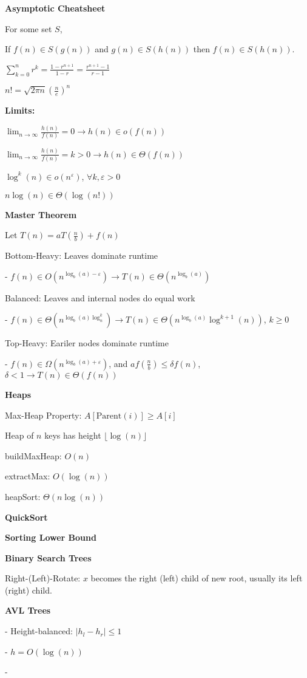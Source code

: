 \documentclass[8pt, letterpaper]{extarticle}
\begin{document}
\vline
\hspace{1pt}
\begin{minipage}[t]{0.45\textwidth}

\textbf{Asymptotic Cheatsheet}

For some set $S$,

If $f(n) \in S(g(n))$ and $g(n) \in S(h(n))$ then $f(n) \in S(h(n))$.

$\sum_{k=0}^{n} r^k = \frac{1 - r^{n+1}}{1 - r} = \frac{r^{n+1} - 1}{r - 1}$

$n! = \sqrt{2\pi n}(\frac{n}{e})^n$

{\small \textbf{Limits: }}

$\lim_{n \to \infty} \frac{h(n)}{f(n)} = 0 \rightarrow h(n) \in o(f(n))$

$\lim_{n \to \infty} \frac{h(n)}{f(n)} = k > 0 \rightarrow h(n) \in \Theta(f(n))$

$\log^k(n) \in o(n^{\varepsilon})$, $\forall k, \varepsilon > 0$

$n\log(n) \in \Theta(\log(n!))$

\textbf{Master Theorem}

Let $T(n) = aT(\frac{n}{b}) + f(n)$

Bottom-Heavy: Leaves dominate runtime

- $f(n) \in O(n^{\log_b(a) - \varepsilon}) \rightarrow T(n) \in \Theta(n^{\log_b(a)})$

Balanced: Leaves and internal nodes do equal work

- $f(n) \in \Theta(n^{\log_b(a) \log^k_n}) \rightarrow T(n) \in \Theta(n^{\log_b(a)}\log^{k+1}(n))$, $k \geq 0$

Top-Heavy: Eariler nodes dominate runtime

- $f(n) \in \Omega(n^{\log_b(a) + \varepsilon})$, and $af(\frac{n}{b}) \leq \delta f(n)$, $\delta < 1 \rightarrow T(n) \in \Theta(f(n))$

\textbf{Heaps}

Max-Heap Property: $A[\text{Parent}(i)] \geq A[i]$

Heap of $n$ keys has height $\lfloor \log(n) \rfloor$

buildMaxHeap: $O(n)$

extractMax: $O(\log(n))$

heapSort: $\Theta(n\log(n))$

\textbf{QuickSort}

\textbf{Sorting Lower Bound}

\textbf{Binary Search Trees}

Right-(Left)-Rotate: $x$ becomes the right (left) child of new root, usually its left (right) child.

\textbf{AVL Trees}

- Height-balanced: $|h_l - h_r| \leq 1$

- $h = O(\log(n))$

- 

\end{minipage}
\end{document}
